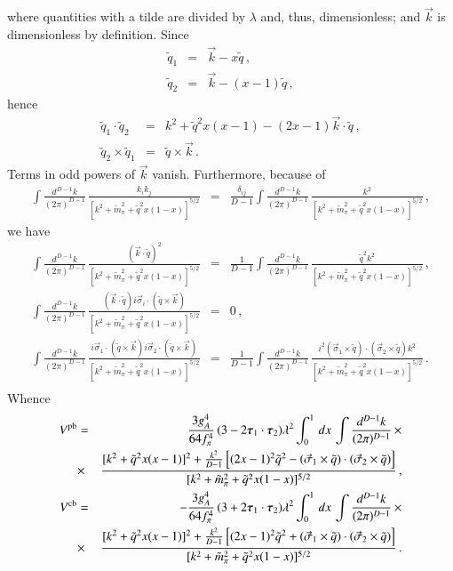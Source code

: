 \documentclass[sort&compress,preprint,3p]{elsarticle}
\begin{document}
%
where quantities with a tilde are divided by $\lambda$ and, thus, dimensionless;
and $\vec k$ is dimensionless by definition. Since
\begin{eqnarray}
\tilde q_1 &=& \vec k -x \tilde q
\,,
\\
\tilde q_2 &=& \vec k -(x-1) \tilde q
\,,
\end{eqnarray}
hence
\begin{eqnarray}
\tilde q_1 \cdot \tilde q_2 &=& k^2 + \tilde q^2 x(x-1) - (2x-1) \vec k \cdot \tilde q
\,,
\\
\tilde q_2 \times \tilde q_1 &=& \tilde q \times \vec k
\,.
\end{eqnarray}
Terms in odd powers of $\vec k$ vanish.
Furthermore, because of
\begin{eqnarray}
\int \frac{d^{D-1} k}{(2\pi)^{D-1}} \, 
\frac{k_i k_j}
{[k^2+\tilde m_\pi^2+\tilde q^2 x(1-x)]^{5/2}}
&=&
\frac{\delta_{ij}}{D-1} \int \frac{d^{D-1} k}{(2\pi)^{D-1}} \, 
\frac{k^2}
{[k^2+\tilde m_\pi^2+\tilde q^2 x(1-x)]^{5/2}}
\,,
\end{eqnarray}
we have
%
\begin{eqnarray}
\int \frac{d^{D-1} k}{(2\pi)^{D-1}} \, 
\frac{(\vec k\cdot \tilde q)^2}
{[k^2+\tilde m_\pi^2+\tilde q^2 x(1-x)]^{5/2}}
&=&
\frac{1}{D-1} \int \frac{d^{D-1} k}{(2\pi)^{D-1}} \, 
\frac{\tilde q^2 k^2}
{[k^2+\tilde m_\pi^2+\tilde q^2 x(1-x)]^{5/2}}
\,,
\nonumber \\
\int \frac{d^{D-1} k}{(2\pi)^{D-1}} \, 
\frac{(\vec k \cdot \tilde q)
i \vec \sigma_i \cdot (\tilde q \times \vec k)}
{[k^2+\tilde m_\pi^2+\tilde q^2 x(1-x)]^{5/2}}
&=& 0
\,,
\nonumber \\
\int \frac{d^{D-1} k}{(2\pi)^{D-1}} \, 
\frac{i \vec \sigma_1 \cdot (\tilde q \times \vec k)
i \vec \sigma_2 \cdot (\tilde q \times \vec k)}
{[k^2+\tilde m_\pi^2+\tilde q^2 x(1-x)]^{5/2}}
&=&
\frac{1}{D-1} \int \frac{d^{D-1} k}{(2\pi)^{D-1}} \, 
\frac{i^2 (\vec \sigma_1 \times \tilde q) \cdot (\vec \sigma_2 \times \tilde q) k^2}
{[k^2+\tilde m_\pi^2+\tilde q^2 x(1-x)]^{5/2}}
\,.
\nonumber \\
\label{eq_divers}
\end{eqnarray}
%
Whence
%
\begin{eqnarray}
V^{\rm pb} &=& \frac{3g_A^4}{64 f_\pi^4} \,
(3-2 \mbox{\boldmath $\tau$}_1 \cdot \mbox{\boldmath $\tau$}_2) 
\lambda^{2}
\int_0^1\, dx\,\int \frac{d^{D-1} k}{(2\pi)^{D-1}} \, 
\times \nonumber \\ &\times&
\frac{[k^2+\tilde q^2x(x-1)]^2+\frac{k^2}{D-1} \left[ (2x-1)^2\tilde q^2
- (\vec \sigma_1 \times \tilde q) \cdot (\vec \sigma_2 \times \tilde q) \right] }
{[k^2+\tilde m_\pi^2+\tilde q^2 x(1-x)]^{5/2}}
\,,
\\
V^{\rm cb} &=& -\frac{3g_A^4}{64 f_\pi^4} \,
(3+2 \mbox{\boldmath $\tau$}_1 \cdot \mbox{\boldmath $\tau$}_2) 
\lambda^{2}
\int_0^1\, dx\,\int \frac{d^{D-1} k}{(2\pi)^{D-1}} \,
\times \nonumber \\ &\times&
\frac{[k^2+\tilde q^2x(x-1)]^2+\frac{k^2}{D-1} \left[ (2x-1)^2\tilde q^2
+ (\vec \sigma_1 \times \tilde q) \cdot (\vec \sigma_2 \times \tilde q) \right] }
{[k^2+\tilde m_\pi^2+\tilde q^2 x(1-x)]^{5/2}}
\,.
\end{eqnarray}
\end{document}
